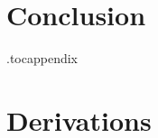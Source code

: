 \section{Conclusion}\label{sec:conc}



\newpage

\printbibliography



\newpage

\appendix

\renewcommand{\theequation}{\thesection\arabic{equation}}
\renewcommand{\thefigure}{\thesection\arabic{figure}}
\renewcommand{\thetable}{\thesection\arabic{table}}
\renewcommand{\theHequation}{\thesection\arabic{equation}}%
\renewcommand{\theHfigure}{\thesection\arabic{figure}}
\renewcommand{\theHtable}{\thesection\arabic{table}}

\let\oldsection\section
\renewcommand{\section}{\clearpage\oldsection}

\etocdepthtag.toc{appendix}
\tableofcontents



\section{Derivations}\label{sec:app-deriv}

